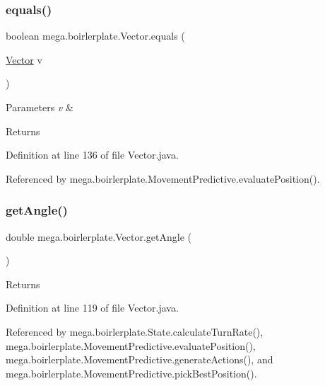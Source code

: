 \subsubsection{\texorpdfstring{equals()}{equals()}}
{\footnotesize\ttfamily boolean mega.\+boirlerplate.\+Vector.\+equals (\begin{DoxyParamCaption}\item[{\hyperlink{classmega_1_1boirlerplate_1_1_vector}{Vector}}]{v }\end{DoxyParamCaption})}


\begin{DoxyParams}{Parameters}
{\em v} & \\
\hline
\end{DoxyParams}
\begin{DoxyReturn}{Returns}

\end{DoxyReturn}


Definition at line 136 of file Vector.\+java.



Referenced by mega.\+boirlerplate.\+Movement\+Predictive.\+evaluate\+Position().

\mbox{\label{classmega_1_1boirlerplate_1_1_vector_a813b7771e479339445175c8d95f57d60}} 
\subsubsection{\texorpdfstring{get\+Angle()}{getAngle()}}
{\footnotesize\ttfamily double mega.\+boirlerplate.\+Vector.\+get\+Angle (\begin{DoxyParamCaption}{ }\end{DoxyParamCaption})}

\begin{DoxyReturn}{Returns}

\end{DoxyReturn}


Definition at line 119 of file Vector.\+java.



Referenced by mega.\+boirlerplate.\+State.\+calculate\+Turn\+Rate(), mega.\+boirlerplate.\+Movement\+Predictive.\+evaluate\+Position(), mega.\+boirlerplate.\+Movement\+Predictive.\+generate\+Actions(), and mega.\+boirlerplate.\+Movement\+Predictive.\+pick\+Best\+Position().

